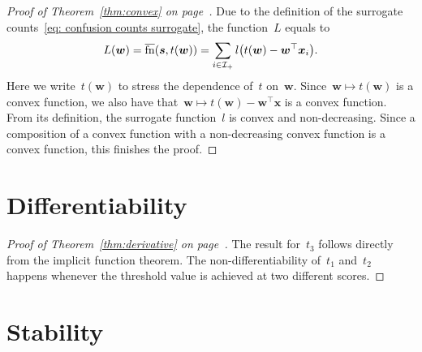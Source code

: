 \thmconvex*
\begin{proof}[Proof of Theorem~\ref{thm:convex} on page~\pageref{thm:convex}]
  Due to the definition of the surrogate counts~\eqref{eq: confusion counts surrogate}, the function~$L$ equals to
  \begin{equation*}
    L(\bm{w}) = \fns(\bm{s}, t(\bm{w})) = \sum_{i \in \Ipos} l \Brac{t(\bm{w}) - \bm{w}^\top \bm{x}_i}.
  \end{equation*}
  Here we write~$t(\bm{w})$ to stress the dependence of~$t$ on~$\bm{w}$. Since~$\bm{w}\mapsto t(\bm{w})$ is a convex function, we also have that~$\bm{w} \mapsto t(\bm{w}) - \bm{w}^\top \bm{x}$ is a convex function. From its definition, the surrogate function~$l$ is convex and non-decreasing. Since a composition of a convex function with a non-decreasing convex function is a convex function, this finishes the proof.
\end{proof}

\section{Differentiability}

\derivative* 
\begin{proof}[Proof of Theorem~\ref{thm:derivative} on page~\pageref{thm:derivative}]
  The result for~$t_3$ follows directly from the implicit function theorem. The non-differentiability of~$t_1$ and~$t_2$ happens whenever the threshold value is achieved at two different scores.
\end{proof}

\pagebreak

\section{Stability}\label{app: stability}

